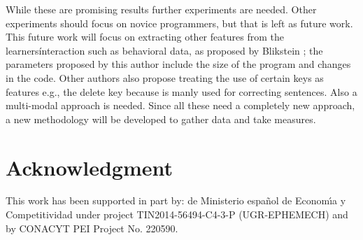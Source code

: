 \documentclass[a4paper,twoside]{article}
\begin{document}
While these are promising results further experiments are needed. Other experiments
should focus on novice programmers, but that is left as future
work. This 
future work will focus on extracting other features from the learners\' interaction
such as behavioral data, as proposed by Blikstein
\cite{blikstein2011using}; the parameters proposed by this author include the size
of the program and changes in the code. Other authors also propose treating the use
of certain keys as features e.g., the delete key because is manly used for correcting
sentences. Also a multi-modal approach is needed. Since all these need
a completely new approach, a new methodology will be developed to
gather data and take measures.  

\section*{Acknowledgment} 
This work has been supported in part by: de Ministerio espa\~{n}ol de Econom\'{\i}a y Competitividad under project TIN2014-56494-C4-3-P (UGR-EPHEMECH) and by CONACYT PEI Project No. 220590.

 



\vfill
\end{document}
